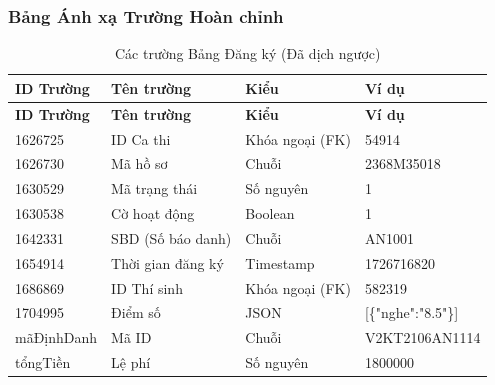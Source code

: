 \documentclass[12pt,a4paper]{article}
\begin{document}
\subsubsection{Bảng Ánh xạ Trường Hoàn chỉnh}

\begin{longtable}{@{}lllp{4cm}@{}}
\caption{Các trường Bảng Đăng ký (Đã dịch ngược)} \\
\toprule
\textbf{ID Trường} & \textbf{Tên trường} & \textbf{Kiểu} & \textbf{Ví dụ} \\
\midrule
\endfirsthead
\toprule
\textbf{ID Trường} & \textbf{Tên trường} & \textbf{Kiểu} & \textbf{Ví dụ} \\
\midrule
\endhead
1626725 & ID Ca thi & Khóa ngoại (FK) & 54914 \\
1626730 & Mã hồ sơ & Chuỗi & 2368M35018 \\
1630529 & Mã trạng thái & Số nguyên & 1 \\
1630538 & Cờ hoạt động & Boolean & 1 \\
1642331 & SBD (Số báo danh) & Chuỗi & AN1001 \\
1654914 & Thời gian đăng ký & Timestamp & 1726716820 \\
1686869 & ID Thí sinh & Khóa ngoại (FK) & 582319 \\
1704995 & Điểm số & JSON & [\{"nghe":"8.5"\}] \\
mãĐịnhDanh & Mã ID & Chuỗi & V2KT2106AN1114 \\
tổngTiền & Lệ phí & Số nguyên & 1800000 \\
\bottomrule
\end{longtable}
\end{document}
